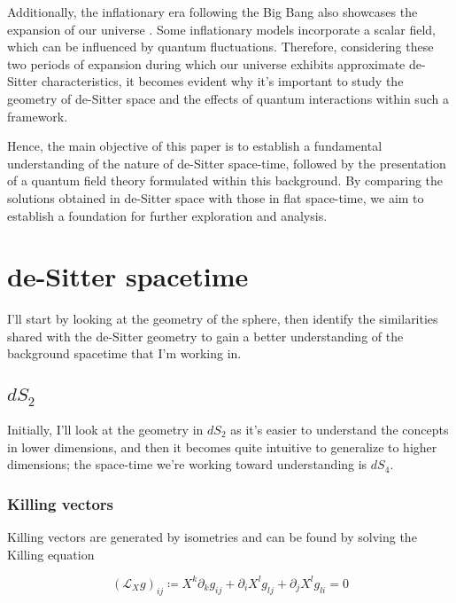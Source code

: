 \documentclass[a4paper,11pt]{article}
\numberwithin{equation}{section}
\numberwithin{figure}{section}
\begin{document}
\begin{large}
Additionally, the inflationary era following the Big Bang also showcases the expansion of our universe \cite{inflation1,inflation2}. Some inflationary models incorporate a scalar field, which can be influenced by quantum fluctuations. Therefore, considering these two periods of expansion during which our universe exhibits approximate de-Sitter characteristics, it becomes evident why it's important to study the geometry of de-Sitter space and the effects of quantum interactions within such a framework.

Hence, the main objective of this paper is to establish a fundamental understanding of the nature of de-Sitter space-time, followed by the presentation of a quantum field theory formulated within this background. By comparing the solutions obtained in de-Sitter space with those in flat space-time, we aim to establish a foundation for further exploration and analysis.


\newpage 


\section{\Large de-Sitter spacetime}


I'll start by looking at the geometry of the sphere, then identify the similarities shared with the de-Sitter geometry to gain a better understanding of the background spacetime that I'm working in. 

\vspace{0.5cm}

\subsection{$dS_2$}


Initially, I'll look at the geometry in $dS_2$ as it's easier to understand the concepts in lower dimensions, and then it becomes quite intuitive to generalize to higher dimensions; the space-time we're working toward understanding is $dS_4$.


\subsubsection{Killing vectors}


Killing vectors are generated by isometries and can be found by solving the Killing equation


$$(\mathcal{L}_Xg)_{ij} \coloneqq X^k \partial _k g_{ij} + \partial _i X^l g_{lj} + \partial _j X^l g_{li}  = 0 $$



\end{large}
\end{document}
